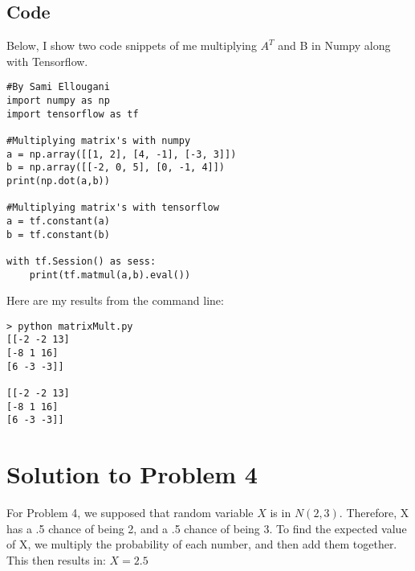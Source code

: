 \documentclass[a4paper]{article}
\begin{document}
\break
\subsection{Code}
Below, I show two code snippets of me multiplying $A^T$ and B in Numpy along with Tensorflow.

\begin{lstlisting}[frame=single]
#By Sami Ellougani
import numpy as np
import tensorflow as tf

#Multiplying matrix's with numpy
a = np.array([[1, 2], [4, -1], [-3, 3]])
b = np.array([[-2, 0, 5], [0, -1, 4]])
print(np.dot(a,b))

#Multiplying matrix's with tensorflow
a = tf.constant(a)
b = tf.constant(b)

with tf.Session() as sess:
	print(tf.matmul(a,b).eval())
\end{lstlisting}
Here are my results from the command line:

\begin{lstlisting}
> python matrixMult.py
[[-2 -2 13]
[-8 1 16]
[6 -3 -3]]

[[-2 -2 13]
[-8 1 16]
[6 -3 -3]]
\end{lstlisting}

\section{Solution to Problem 4}
For Problem 4, we supposed that random variable $X$ is in $N(2,3)$. Therefore, X has a .5 chance of being 2, and a .5 chance of being 3.
To find the expected value of X, we multiply the probability of each number, and then add them together. This then results in:
$X = 2.5$
\end{document}
